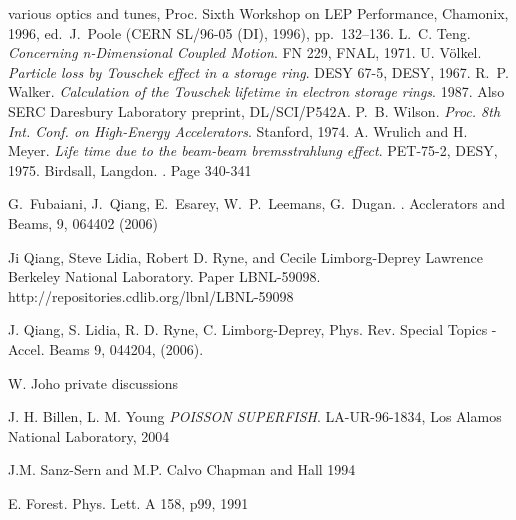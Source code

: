 \begin{thebibliography}{10}
{    various optics and tunes}, Proc. Sixth Workshop on LEP
  Performance, Chamonix, 1996, ed.~J.~Poole (CERN SL/96-05 (DI),
  1996), pp.~132--136.
L.~C. Teng.
{\sl Concerning n-Dimensional Coupled Motion}.
FN 229, FNAL, 1971.
U. V\"olkel.
{\sl Particle loss by Touschek effect in a storage ring}.
DESY 67-5, DESY, 1967.
R.~P. Walker.
{\sl Calculation of the Touschek lifetime in electron storage rings}.
1987.
Also SERC Daresbury Laboratory preprint, DL/SCI/P542A.
P.~B. Wilson.
{\sl Proc. 8th Int. Conf. on High-Energy Accelerators}.
Stanford, 1974.
A. Wrulich and H. Meyer.
{\sl Life time due to the beam-beam bremsstrahlung effect}.
PET-75-2, DESY, 1975.
%
  Birdsall, Langdon.
  .
  \newblock Page 340-341

  G.\ Fubaiani, J.\ Qiang, E.\ Esarey, W.\ P.\ Leemans, G.\ Dugan.
  .
  \newblock Acclerators and Beams, 9, 064402 (2006) 
 
 Ji Qiang, Steve Lidia, Robert D. Ryne, and Cecile Limborg-Deprey
    \newblock Lawrence Berkeley National Laboratory. Paper LBNL-59098. http://repositories.cdlib.org/lbnl/LBNL-59098
 
 J. Qiang, S. Lidia, R. D. Ryne, C. Limborg-Deprey, 
  \newblock Phys. Rev. Special Topics - Accel. Beams 9, 044204, (2006).
 
 W. Joho
  \newblock private discussions
 
J. H. Billen, L. M. Young
{\sl POISSON SUPERFISH}.
LA-UR-96-1834, Los Alamos National Laboratory, 2004
 
J.M. Sanz-Sern and M.P. Calvo
Chapman and Hall 1994

 E. Forest. Phys. Lett. A 158, p99, 1991


\end{thebibliography}
